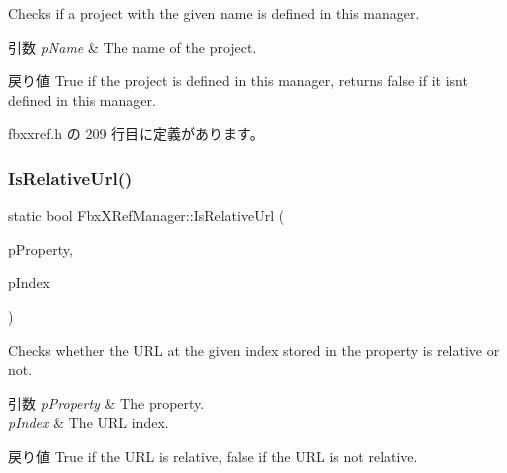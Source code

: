 Checks if a project with the given name is defined in this manager. 
\begin{DoxyParams}{引数}
{\em p\+Name} & The name of the project. \\
\hline
\end{DoxyParams}
\begin{DoxyReturn}{戻り値}
{\ttfamily True} if the project is defined in this manager, returns {\ttfamily false} if it isn\textquotesingle{}t defined in this manager. 
\end{DoxyReturn}


 fbxxref.\+h の 209 行目に定義があります。

\mbox{\label{class_fbx_x_ref_manager_a27481156423d70e759c131954e3ea9a0}} 
\subsubsection{\texorpdfstring{Is\+Relative\+Url()}{IsRelativeUrl()}}
{\footnotesize\ttfamily static bool Fbx\+X\+Ref\+Manager\+::\+Is\+Relative\+Url (\begin{DoxyParamCaption}\item[{\hyperlink{class_fbx_property}{Fbx\+Property} const \&}]{p\+Property,  }\item[{int}]{p\+Index }\end{DoxyParamCaption})\hspace{0.3cm}{\ttfamily [static]}}

Checks whether the U\+RL at the given index stored in the property is relative or not. 
\begin{DoxyParams}{引数}
{\em p\+Property} & The property. \\
\hline
{\em p\+Index} & The U\+RL index. \\
\hline
\end{DoxyParams}
\begin{DoxyReturn}{戻り値}
{\ttfamily True} if the U\+RL is relative, {\ttfamily false} if the U\+RL is not relative. 
\end{DoxyReturn}
\mbox{\label{class_fbx_x_ref_manager_ae590ccb6ae282bed68c60bf697cd2645}} 
